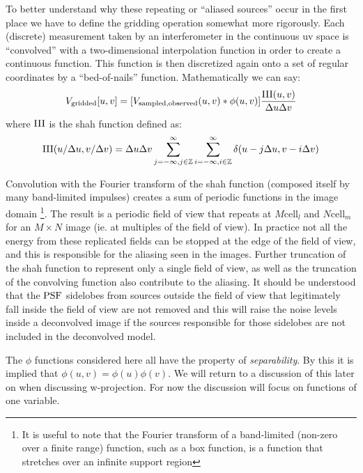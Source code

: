  To better understand why these repeating or ``aliased sources'' occur in the first place we have to define the gridding operation somewhat more 
 rigorously. Each (discrete) measurement taken by an interferometer in the continuous uv space  is ``convolved'' with a two-dimensional interpolation 
 function in order to create a continuous function. This function is then discretized again onto a set of regular coordinates by a 
 ``bed-of-nails'' function. Mathematically we can say:
 \begin{equation}
  V_{\text{gridded}}[u,v] = [V_{\text{sampled,observed}}(u,v)*\phi(u,v)]\frac{\textrm{III}(u,v)}{\Delta{u}\Delta{v}}
 \end{equation}
 where $\textrm{III}$ is the shah function defined as:
 \begin{equation}
  \textrm{III}(u/\Delta{u},v/\Delta{v})=\Delta{u}\Delta{v}\sum_{j=-\infty,j\in\mathbb{Z}}^{\infty}{\sum_{i=-\infty,i\in\mathbb{Z}}^{\infty}{\delta{(u-j\Delta{u},v-i\Delta{v})}}}
 \end{equation}
 
 Convolution with the Fourier transform of the shah function (composed itself by many band-limited impulses) creates a sum of periodic functions
 in the image domain \footnote{It is useful to note that the Fourier transform of a band-limited (non-zero over a finite range) function, 
 such as a box function, is a function that stretches over an infinite support region}. The result is a periodic field of view that repeats at
 $M\text{cell}_l$ and $N\text{cell}_m$ for an $M\times N$ image (ie. at multiples of the field of view). In practice not all the energy from 
 these replicated fields can be stopped at the edge of the field of view, and this is responsible for the aliasing seen in the images. Further
 truncation of the shah function to represent only a single field of view, as well as the truncation of the convolving function also 
 contribute to the aliasing. It should be understood that the $\textrm{PSF}$ sidelobes from sources outside the field of view that legitimately fall inside
 the field of view are not removed and this will raise the noise levels inside a deconvolved image if the sources responsible for those sidelobes are not
 included in the deconvolved model.
 
 The $\phi$ functions considered here all have the property of \emph{separability}. By this it is implied that $\phi(u,v) = \phi(u)\phi(v)$. We will return
 to a discussion of this later on when discussing w-projection. For now the discussion will focus on functions of one variable.
 

